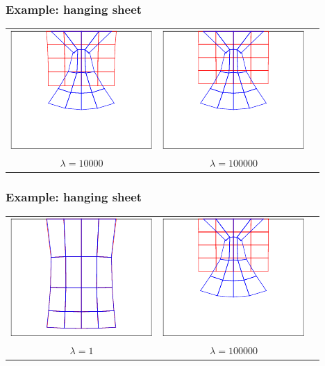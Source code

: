 \documentclass[american,ignorenonframetext,notheorems]{beamer}
\begin{document}
\begin{frame}
  \frametitle{Example: hanging sheet}
  \centering
  \begin{tabular}{ccc}
    \includegraphics[width=.45\textwidth]{./graph/elasticity/stalactite-4}
    &\includegraphics[width=.45\textwidth]{./graph/elasticity/stalactite-5}
    \\
    $\lambda = 10000$&$\lambda = 100000$
  \end{tabular}
\end{frame}

\begin{frame}
  \frametitle{Example: hanging sheet}
  \centering
  \begin{tabular}{ccc}
    \includegraphics[width=.45\textwidth]{./graph/elasticity/stalactite-0}
    &\includegraphics[width=.45\textwidth]{./graph/elasticity/stalactite-5}
    \\
    $\lambda = 1$&$\lambda = 100000$
  \end{tabular}
\end{frame}
\end{document}
